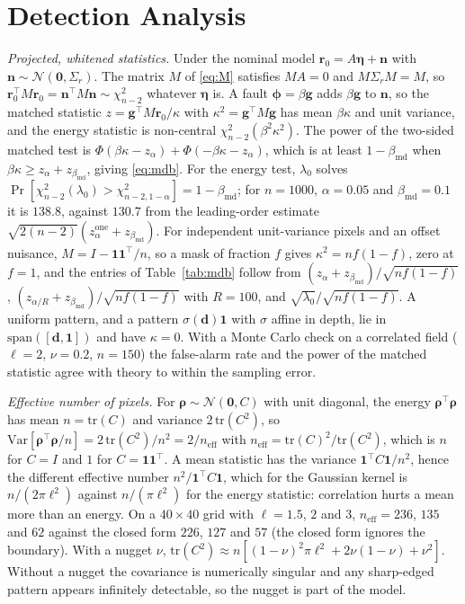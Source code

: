 \section{Detection Analysis}
\label{app:detection}
\emph{Projected, whitened statistics.} Under the nominal model $\mathbf{r}_0=A\boldsymbol\eta+\mathbf{n}$
with $\mathbf{n}\sim\mathcal{N}(\mathbf{0},\Sigma_r)$. The matrix $M$ of \eqref{eq:M} satisfies
$MA=0$ and $M\Sigma_rM=M$, so $\mathbf{r}_0^{\top}M\mathbf{r}_0=\mathbf{n}^{\top}M\mathbf{n}\sim\chi^{2}_{n-2}$ whatever
$\boldsymbol\eta$ is. A fault $\boldsymbol\phi=\beta\mathbf{g}$ adds $\beta\mathbf{g}$ to $\mathbf{n}$, so the matched
statistic $z=\mathbf{g}^{\top}M\mathbf{r}_0/\kappa$ with $\kappa^{2}=\mathbf{g}^{\top}M\mathbf{g}$ has mean $\beta\kappa$ and unit
variance, and the energy statistic is non-central $\chi^{2}_{n-2}(\beta^{2}\kappa^{2})$. The power of the
two-sided matched test is $\Phi(\beta\kappa-z_\alpha)+\Phi(-\beta\kappa-z_\alpha)$, which is at least
$1-\beta_{\mathrm{md}}$ when $\beta\kappa\ge z_\alpha+z_{\beta_{\mathrm{md}}}$, giving \eqref{eq:mdb}. For the energy
test, $\lambda_0$ solves $\Pr[\chi^{2}_{n-2}(\lambda_0)>\chi^{2}_{n-2,1-\alpha}]=1-\beta_{\mathrm{md}}$; for
$n=1000$, $\alpha=0.05$ and $\beta_{\mathrm{md}}=0.1$ it is $138.8$, against $130.7$ from the leading-order
estimate $\sqrt{2(n-2)}(z_{\alpha}^{\mathrm{one}}+z_{\beta_{\mathrm{md}}})$. For independent unit-variance pixels
and an offset nuisance, $M=I-\mathbf{1}\mathbf{1}^{\top}/n$, so a mask of fraction $f$ gives
$\kappa^{2}=nf(1-f)$, zero at $f=1$, and the entries of Table~\ref{tab:mdb} follow from
$(z_\alpha+z_{\beta_{\mathrm{md}}})/\sqrt{nf(1-f)}$, $(z_{\alpha/R}+z_{\beta_{\mathrm{md}}})/\sqrt{nf(1-f)}$ with $R=100$,
and $\sqrt{\lambda_0}/\sqrt{nf(1-f)}$. A uniform pattern, and a pattern $\sigma(\mathbf{d})\mathbf{1}$ with
$\sigma$ affine in depth, lie in $\mathrm{span}([\mathbf{d},\mathbf{1}])$ and have $\kappa=0$. With a Monte Carlo
check on a correlated field ($\ell=2$, $\nu=0.2$, $n=150$) the false-alarm rate and the power of the
matched statistic agree with theory to within the sampling error.

\emph{Effective number of pixels.} For $\boldsymbol\rho\sim\mathcal{N}(\mathbf{0},C)$ with unit diagonal, the
energy $\boldsymbol\rho^{\top}\boldsymbol\rho$ has mean $n=\mathrm{tr}(C)$ and variance $2\,\mathrm{tr}(C^{2})$, so
$\mathrm{Var}[\boldsymbol\rho^{\top}\boldsymbol\rho/n]=2\,\mathrm{tr}(C^{2})/n^{2}=2/n_{\mathrm{eff}}$ with
$n_{\mathrm{eff}}=\mathrm{tr}(C)^{2}/\mathrm{tr}(C^{2})$, which is $n$ for $C=I$ and $1$ for $C=\mathbf{1}\mathbf{1}^{\top}$.
A mean statistic has the variance $\mathbf{1}^{\top}C\mathbf{1}/n^{2}$, hence the different effective number
$n^{2}/\mathbf{1}^{\top}C\mathbf{1}$, which for the Gaussian kernel is $n/(2\pi\ell^{2})$ against
$n/(\pi\ell^{2})$ for the energy statistic: correlation hurts a mean more than an energy. On a
$40\times40$ grid with $\ell=1.5$, $2$ and $3$, $n_{\mathrm{eff}}=236$, $135$ and $62$ against the closed form
$226$, $127$ and $57$ (the closed form ignores the boundary). With a nugget $\nu$,
$\mathrm{tr}(C^{2})\approx n[(1-\nu)^{2}\pi\ell^{2}+2\nu(1-\nu)+\nu^{2}]$. Without a nugget the
covariance is numerically singular and any sharp-edged pattern appears infinitely detectable, so
the nugget is part of the model.

